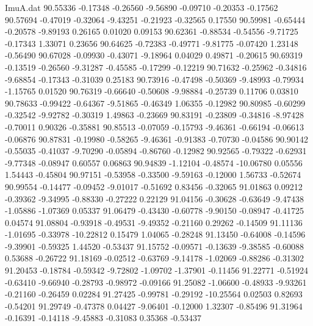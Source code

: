 \begin{filecontents}{ImuA.dat}
  90.55336   -0.17348   -0.26560   -9.56890   -0.09710   -0.20353   -0.17562
  90.57694   -0.47019   -0.32064   -9.43251   -0.21923   -0.32565    0.17550
  90.59981   -0.65444   -0.20578   -9.89193    0.26165    0.01020    0.09153
  90.62361   -0.88534   -0.54556   -9.71725   -0.17343    1.33071    0.23656
  90.64625   -0.72383   -0.49771   -9.81775   -0.07420    1.23148   -0.56490
  90.67028   -0.09930   -0.43071   -9.18964    0.04029    0.49871   -0.20615
  90.69319   -0.13519   -0.26560   -9.31287   -0.45585   -0.17299   -0.12219
  90.71632   -0.25962   -0.34816   -9.68854   -0.17343   -0.31039    0.25183
  90.73916   -0.47498   -0.50369   -9.48993   -0.79934   -1.15765    0.01520
  90.76319   -0.66640   -0.50608   -9.98884   -0.25739    0.11706    0.03810
  90.78633   -0.99422   -0.64367   -9.51865   -0.46349    1.06355   -0.12982
  90.80985   -0.60299   -0.32542   -9.92782   -0.30319    1.49863   -0.23669
  90.83191   -0.23809   -0.34816   -8.97428   -0.70011    0.90326   -0.35881
  90.85513   -0.07059   -0.15793   -9.46361   -0.66194   -0.06613   -0.06876
  90.87831   -0.19980   -0.58265   -9.46361   -0.91383   -0.70730   -0.04586
  90.90142   -0.55035   -0.41037   -9.70290   -0.05894   -0.86760   -0.12982
  90.92565   -0.79322   -0.62931   -9.77348   -0.08947    0.60557    0.06863
  90.94839   -1.12104   -0.48574  -10.06780    0.05556    1.54443   -0.45804
  90.97151   -0.53958   -0.33500   -9.59163   -0.12000    1.56733   -0.52674
  90.99554   -0.14477   -0.09452   -9.01017   -0.51692    0.83456   -0.32065
  91.01863    0.09212   -0.39362   -9.34995   -0.88330   -0.27222    0.22129
  91.04156   -0.30628   -0.63649   -9.47438   -1.05886   -1.07369    0.05337
  91.06479   -0.43430   -0.60778   -9.90150   -0.08947   -0.41725    0.04574
  91.08804   -0.93918   -0.49531   -9.49352   -0.21160    0.29262   -0.14509
  91.11136   -1.01695   -0.33978  -10.22812    0.15479    1.04065   -0.28248
  91.13450   -0.64008   -0.14596   -9.39901   -0.59325    1.44520   -0.53437
  91.15752   -0.09571   -0.13639   -9.38585   -0.60088    0.53688   -0.26722
  91.18169   -0.02512   -0.63769   -9.14178   -1.02069   -0.88286   -0.31302
  91.20453   -0.18784   -0.59342   -9.72802   -1.09702   -1.37901   -0.11456
  91.22771   -0.51924   -0.63410   -9.66940   -0.28793   -0.98972   -0.09166
  91.25082   -1.06600   -0.48933   -9.93261   -0.21160   -0.26459    0.02284
  91.27425   -0.99781   -0.29192  -10.25564    0.02503    0.82693   -0.54201
  91.29749   -0.47378    0.04427   -9.06401   -0.12000    1.32307   -0.85496
  91.31964   -0.16391   -0.14118   -9.45883   -0.31083    0.35368   -0.53437

\end{filecontents}
